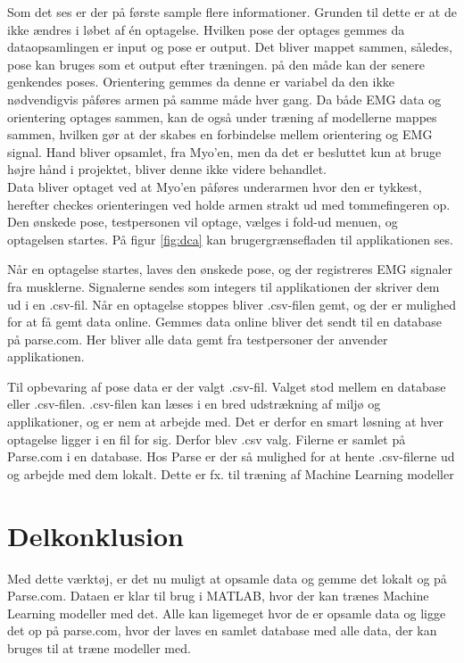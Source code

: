 Som det ses er der på første sample flere informationer. Grunden til dette er at de ikke ændres i løbet af én optagelse. Hvilken pose der optages gemmes da dataopsamlingen er input og pose er output. Det bliver mappet sammen, således, pose kan bruges som et output efter træningen. på den måde kan der senere genkendes poses. Orientering gemmes da denne er variabel da den ikke nødvendigvis påføres armen på samme måde hver gang. Da både EMG data og orientering optages sammen, kan de også under træning af modellerne mappes sammen, hvilken gør at der skabes en forbindelse mellem orientering og EMG signal. Hand bliver opsamlet, fra Myo'en, men da det er besluttet kun at bruge højre hånd i projektet, bliver denne ikke videre behandlet.\\
Data bliver optaget ved at Myo'en påføres underarmen hvor den er tykkest, herefter checkes orienteringen ved holde armen strakt ud med tommefingeren op. Den ønskede pose, testpersonen vil optage, vælges i fold-ud menuen, og optagelsen startes. På figur \ref{fig:dca} kan brugergrænsefladen til applikationen ses.


Når en optagelse startes, laves den ønskede pose, og der registreres EMG signaler fra musklerne. Signalerne sendes som integers til applikationen der skriver dem ud i en .csv-fil. Når en optagelse stoppes bliver .csv-filen gemt, og der er mulighed for at få gemt data online. Gemmes data online bliver det sendt til en database på parse.com\citep{RefWorks:11}. Her bliver alle data gemt fra testpersoner der anvender applikationen.

Til opbevaring af pose data er der valgt .csv-fil. Valget stod mellem en database eller .csv-filen. .csv-filen kan læses i en bred udstrækning af miljø og applikationer, og er nem at arbejde med. Det er derfor en smart løsning at hver optagelse ligger i en fil for sig. Derfor blev .csv valg. Filerne er samlet på Parse.com i en database. Hos Parse er der så mulighed for at hente .csv-filerne ud og arbejde med dem lokalt. Dette er fx. til træning af Machine Learning modeller

\section{Delkonklusion}
Med dette værktøj, er det nu muligt at opsamle data og gemme det lokalt og på Parse.com. Dataen er klar til brug i MATLAB, hvor der kan trænes Machine Learning modeller med det. Alle kan ligemeget hvor de er opsamle data og ligge det op på parse.com, hvor der laves en samlet database med alle data, der kan bruges til at træne modeller med. 